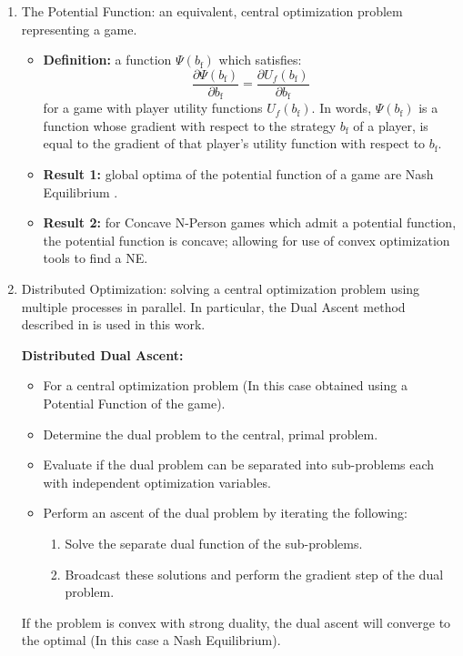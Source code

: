 \documentclass[12pt,a4paper]{report}
\begin{document}
\begin{enumerate}
\begin{itemize}
\end{itemize}
\item The Potential Function: an equivalent, central optimization problem representing a game.
\begin{itemize}
\item
\textbf{Definition:}  a function
$ \Psi(b_{\text{f}})$ which satisfies:
\begin{equation}\label{potential_game_condition}
\frac{\partial \Psi(b_{\text{f}})}{\partial b_{\text{f}}}
 =
 \frac{\partial U_f(b_{\text{f}})}{\partial b_{\text{f}}}
\end{equation} 
for a game with player utility functions $U_f(b_{\text{f}})$.
In words, $ \Psi(b_{\text{f}})$ is a function whose gradient with respect to the strategy $b_{\text{f}}$ of a player, is equal to the gradient of that player's utility function with respect to $b_{\text{f}}$.
\item \textbf{Result 1:} global optima of the potential function of a game are Nash Equilibrium \cite{monderer1996potential}.
\item \textbf{Result 2:} for Concave N-Person games which admit a potential function, the potential function is concave; allowing for use of convex optimization tools to find a NE. 
\end{itemize}



\item Distributed Optimization: solving a central optimization problem using multiple processes in parallel.
In particular, the Dual Ascent method described in \cite{boyd2011distributed} is used in this work.

\textbf{Distributed Dual Ascent:} 
\begin{itemize}
\item For a central optimization problem (In this case obtained using a Potential Function of the game).
\item Determine the dual problem to the central, primal problem.
\item Evaluate if the dual problem can be separated into sub-problems each with independent optimization variables.
\item Perform an ascent of the dual problem by iterating the following:
\begin{enumerate}
\item Solve the separate dual function of the sub-problems.
\item Broadcast these solutions and perform the gradient step of the dual problem.
\end{enumerate}
\end{itemize}

If the problem is convex with strong duality, the dual ascent will converge to the optimal (In this case a Nash Equilibrium).

\end{enumerate}
\end{document}

